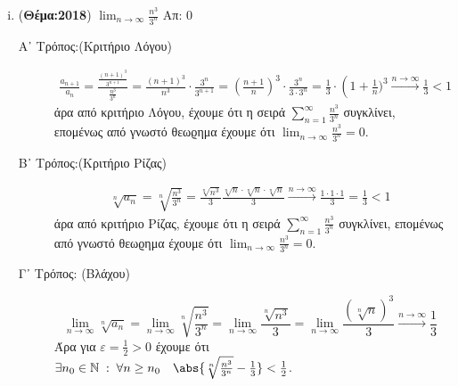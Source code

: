\begin{enumerate}
\begin{enumerate}[i)]
    \item ({\bfseries Θέμα:2018}) $ \lim_{n \to \infty} \frac{n^{3}}{3^{n}} $ 
        \hfill Απ: $ 0 $
        \begin{description}
            \item [Α᾽ Τρόπος:(Κριτήριο Λόγου)]
                \begin{align*}
                    \frac{a_{n+1}}{a_{n}} = 
                    \frac{\frac{(n+1)^{3}}{3^{n+1}}}{\frac{n^{3}}{3^{n}}} = 
                    \frac{(n+1)^{3}}{n^{3}} \cdot \frac{3^{n}}{3^{n+1}} = 
                    \left(\frac{n+1}{n} \right)^{3} \cdot \frac{3^{n}}{3\cdot 3^{n}} = 
                    \frac{1}{3} \cdot \left(1 + \frac{1}{n})^{3} 
                        \xrightarrow{n \to \infty} \frac{1}{3} < 1
                    \end{align*}
                    άρα από κριτήριο Λόγου, έχουμε ότι η σειρά 
                    $ \sum_{n=1}^{\infty} \frac{n^{3}}{3^{n}} $ συγκλίνει, επομένως 
                    από γνωστό θεωϱημα έχουμε ότι $ \lim_{n \to \infty} 
                    \frac{n^{3}}{3^{n}} = 0 $.

                \item [Β᾽ Τρόπος:(Κριτήριο Ρίζας)]
                    \begin{align*}
                        \sqrt[n]{a_{n}} = \sqrt[n]{\frac{n^{3}}{3^{n}}} = 
                        \frac{\sqrt[n]{n^{3}}}{3} \frac{\sqrt[n]{n} 
                            \cdot \sqrt[n]{n} \cdot \sqrt[n]{n}
                        }{3} \xrightarrow{n \to \infty} \frac{1 \cdot 1 \cdot 1}{3} = 
                        \frac{1}{3} < 1
                    \end{align*}
                    άρα από κριτήριο Ρίζας, έχουμε ότι η σειρά 
                    $ \sum_{n=1}^{\infty} \frac{n^{3}}{3^{n}} $ συγκλίνει, επομένως 
                    από γνωστό θεωϱημα έχουμε ότι $ \lim_{n \to \infty} 
                    \frac{n^{3}}{3^{n}} = 0 $.

                \item [Γ᾽ Τρόπος: (Βλάχου)]
                    \[
                        \lim_{n \to \infty} \sqrt[n]{a_{n}} = \lim_{n \to \infty} 
                        \sqrt[n]{\frac{n^{3}}{3^{n}}} = \lim_{n \to \infty} 
                        \frac{\sqrt[n]{n^{3}}}{3} = \lim_{n \to \infty} 
                        \frac{(\sqrt[n]{n})^{3}}{3} \xrightarrow{n \to \infty} 
                        \frac{1}{3}  
                    \] 
                    Άρα για $ \varepsilon = \frac{1}{2} >0 $ έχουμε ότι $ \exists n_{0} 
                    \in \mathbb{N} \; : \; \forall n \geq n_{0} \quad 
                    \abs{\sqrt[n]{\frac{n^{3}}{3^{n}}} - \frac{1}{3}} < 
                    \frac{1}{2} $.


\end{description}
\end{enumerate}
\end{enumerate}
